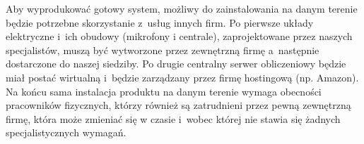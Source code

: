 \documentclass[../main.tex]{subfiles}
\begin{document}
{{        Aby wyprodukować gotowy system, możliwy do zainstalowania na danym terenie
        będzie potrzebne skorzystanie z~usług innych firm. Po pierwsze układy
        elektryczne i~ich obudowy (mikrofony i centrale), zaprojektowane przez naszych
        specjalistów, muszą być wytworzone przez zewnętrzną firmę a~następnie dostarczone
        do naszej siedziby. Po drugie centralny serwer obliczeniowy będzie miał postać
        wirtualną i~będzie zarządzany przez firmę hostingową (np. Amazon). Na końcu
        sama instalacja produktu na danym terenie wymaga obecności pracowników
        fizycznych, którzy również są zatrudnieni przez pewną zewnętrzną firmę, która
        może zmieniać się w czasie i~wobec której nie stawia się żadnych
        specjalistycznych wymagań.
    }
}
\end{document}
